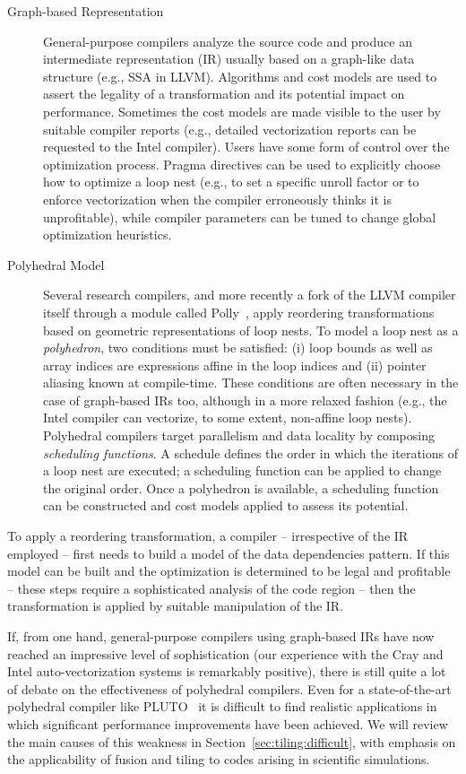 \begin{description}
\item[Graph-based Representation] General-purpose compilers analyze the source code and produce an intermediate representation (IR) usually based on a graph-like data structure (e.g., SSA in LLVM). Algorithms and cost models are used to assert the legality of a transformation and its potential impact on performance. Sometimes the cost models are made visible to the user by suitable compiler reports (e.g., detailed vectorization reports can be requested to the Intel compiler). Users have some form of control over the optimization process. Pragma directives can be used to explicitly choose how to optimize a loop nest (e.g., to set a specific unroll factor or to enforce vectorization when the compiler erroneously thinks it is unprofitable), while compiler parameters can be tuned to change global optimization heuristics. 
\item[Polyhedral Model] Several research compilers, and more recently a fork of the LLVM compiler itself through a module called Polly~\cite{polly}, apply reordering transformations based on geometric representations of loop nests. To model a loop nest as a {\em polyhedron}, two conditions must be satisfied: (i) loop bounds as well as array indices are expressions affine in the loop indices and (ii) pointer aliasing known at compile-time. These conditions are often necessary in the case of graph-based IRs too, although in a more relaxed fashion (e.g., the Intel compiler can vectorize, to some extent, non-affine loop nests). Polyhedral compilers target parallelism and data locality by composing {\em scheduling functions}. A schedule defines the order in which the iterations of a loop nest are executed; a scheduling function can be applied to change the original order. Once a polyhedron is available, a scheduling function can be constructed and cost models applied to assess its potential.
\end{description}

To apply a reordering transformation, a compiler -- irrespective of the IR employed -- first needs to build a model of the data dependencies pattern. If this model can be built and the optimization is determined to be legal and profitable -- these steps require a sophisticated analysis of the code region -- then the transformation is applied by suitable manipulation of the IR. 

If, from one hand, general-purpose compilers using graph-based IRs have now reached an impressive level of sophistication (our experience with the Cray and Intel auto-vectorization systems is remarkably positive), there is still quite a lot of debate on the effectiveness of polyhedral compilers. Even for a state-of-the-art polyhedral compiler like PLUTO~\citep{pluto} it is difficult to find realistic applications in which significant performance improvements have been achieved. We will review the main causes of this weakness in Section~\ref{sec:tiling:difficult}, with emphasis on the applicability of fusion and tiling to codes arising in scientific simulations. 


